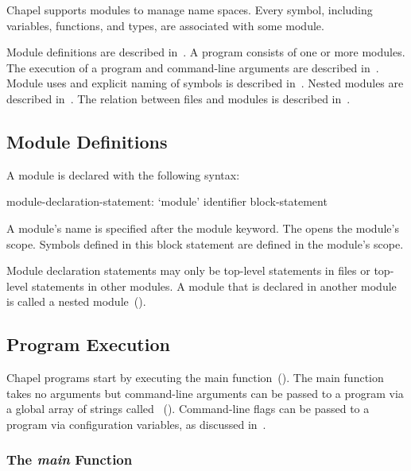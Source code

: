 \label{Modules}


Chapel supports modules to manage name spaces.  Every symbol,
including variables, functions, and types, are associated with some
module.

Module definitions are described in~.  A
program consists of one or more modules.  The execution of a program
and command-line arguments are described in~.
Module uses and explicit naming of symbols is described
in~.  Nested modules are described
in~.  The relation between files and modules is
described in~.

\subsection{Module Definitions}
\label{Module_Definitions}


A module is declared with the following syntax:
\begin{syntax}
module-declaration-statement:
  `module' identifier block-statement
\end{syntax}
A module's name is specified after the module keyword.
The  opens the module's scope.  Symbols defined
in this block statement are defined in the module's scope.

Module declaration statements may only be top-level statements in
files or top-level statements in other modules.  A module that is
declared in another module is called a nested
module~().

\subsection{Program Execution}
\label{Program_Execution}

Chapel programs start by executing the main
function~().  The main function takes no
arguments but command-line arguments can be passed to a program via a
global array of strings
called ~().  Command-line
flags can be passed to a program via configuration variables, as
discussed in~.

\subsubsection{The {\em main} Function}
\label{The_main_Function}

